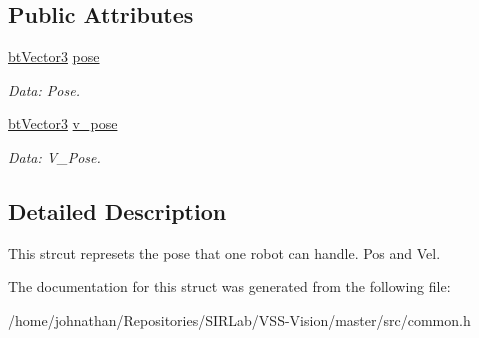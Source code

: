 \subsection*{Public Attributes}
\begin{DoxyCompactItemize}
\item 
\hyperlink{structcommon_1_1btVector3}{bt\+Vector3} \hyperlink{structcommon_1_1Robot_a31960c8ccd21cde1ca66e263851b83ad}{pose}\hypertarget{structcommon_1_1Robot_a31960c8ccd21cde1ca66e263851b83ad}{}\label{structcommon_1_1Robot_a31960c8ccd21cde1ca66e263851b83ad}

\begin{DoxyCompactList}\small\item\em Data\+: Pose. \end{DoxyCompactList}\item 
\hyperlink{structcommon_1_1btVector3}{bt\+Vector3} \hyperlink{structcommon_1_1Robot_a8114313ba162326a4cb51ce4d5c992f2}{v\+\_\+pose}\hypertarget{structcommon_1_1Robot_a8114313ba162326a4cb51ce4d5c992f2}{}\label{structcommon_1_1Robot_a8114313ba162326a4cb51ce4d5c992f2}

\begin{DoxyCompactList}\small\item\em Data\+: V\+\_\+\+Pose. \end{DoxyCompactList}\end{DoxyCompactItemize}


\subsection{Detailed Description}
This strcut represets the pose that one robot can handle. Pos and Vel. 

The documentation for this struct was generated from the following file\+:\begin{DoxyCompactItemize}
\item 
/home/johnathan/\+Repositories/\+S\+I\+R\+Lab/\+V\+S\+S-\/\+Vision/master/src/common.\+h\end{DoxyCompactItemize}
